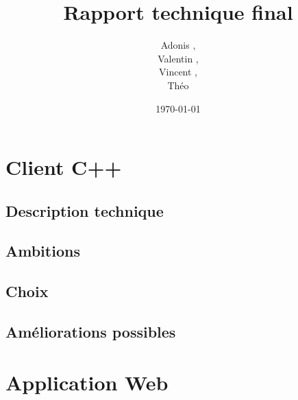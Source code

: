 \documentclass[a4paper]{article}
\title{Rapport technique final}
\author{Adonis \bsc{Najimi},\\
 Valentin \bsc{Stern},\\
 Vincent \bsc{Albert},\\
 Théo \bsc{Gerriet}}
\date{\today}
\begin{document}
\maketitle
\newpage

\section{Client C++}
    \subsection{Description technique}
    

    \subsection{Ambitions}
    

    \subsection{Choix}
    
    
    \subsection{Améliorations possibles}
    
\newpage
\section{Application Web}
\newpage
\tableofcontents
\end{document}
